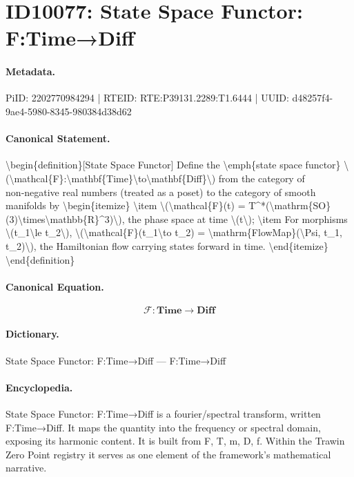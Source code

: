 \section*{ID10077: State Space Functor: F:Time→Diff}
\paragraph{Metadata.}
PiID: 2202770984294 | RTEID: RTE:P39131.2289:T1.6444 | UUID: d48257f4-9ae4-5980-8345-980384d38d62

\paragraph{Canonical Statement.}
\textbackslash{}begin\{definition\}[State Space Functor] Define the \textbackslash{}emph\{state space functor\} \textbackslash{}(\textbackslash{}mathcal\{F\}:\textbackslash{}mathbf\{Time\}\textbackslash{}to\textbackslash{}mathbf\{Diff\}\textbackslash{}) from the category of non‑negative real numbers (treated as a poset) to the category of smooth manifolds by \textbackslash{}begin\{itemize\} \textbackslash{}item \textbackslash{}(\textbackslash{}mathcal\{F\}(t) = T\textasciicircum{}*(\textbackslash{}mathrm\{SO\}(3)\textbackslash{}times\textbackslash{}mathbb\{R\}\textasciicircum{}3)\textbackslash{}), the phase space at time \textbackslash{}(t\textbackslash{}); \textbackslash{}item For morphisms \textbackslash{}(t\_1\textbackslash{}le t\_2\textbackslash{}), \textbackslash{}(\textbackslash{}mathcal\{F\}(t\_1\textbackslash{}to t\_2) = \textbackslash{}mathrm\{FlowMap\}(\textbackslash{}Psi, t\_1, t\_2)\textbackslash{}), the Hamiltonian flow carrying states forward in time. \textbackslash{}end\{itemize\} \textbackslash{}end\{definition\}

\paragraph{Canonical Equation.}
\[
\mathcal{F}:\mathbf{Time}\to\mathbf{Diff}
\]

\paragraph{Dictionary.}
State Space Functor: F:Time→Diff — F:Time→Diff

\paragraph{Encyclopedia.}
State Space Functor: F:Time→Diff is a fourier/spectral transform, written F:Time→Diff. It maps the quantity into the frequency or spectral domain, exposing its harmonic content. It is built from F, T, m, D, f. Within the Trawin Zero Point registry it serves as one element of the framework's mathematical narrative.
